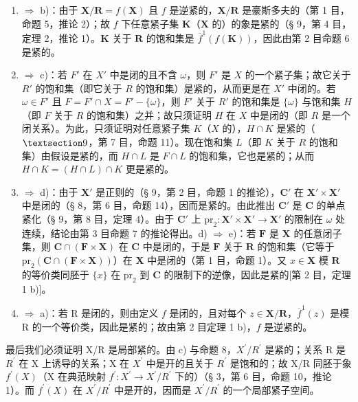 \begin{enumerate}
\def\labelenumi{\alph{enumi})}
\item
  \(\Longrightarrow\) b)：由于 \(\mathbf{X} / \mathbf{R} = f(\mathbf{X})\) 且 \(f\) 是逆紧的，\(\mathbf{X} / \mathbf{R}\) 是豪斯多夫的（第 1 目，命题 5，推论 2）；故 \(f\) 下任意紧子集 \(\mathbf{K}\)（\(\mathbf{X}\) 的）的象是紧的（§ 9，第 4 目，定理 2，推论 1）。\(\mathbf{K}\) 关于 \(\mathbf{R}\) 的饱和集是 \(\overline{f}^1(f(\mathbf{K}))\)，因此由第 2 目命题 6 是紧的。
\item
  \(\Longrightarrow\) c)：若 \(F'\) 在 \(X'\) 中是闭的且不含 \(\omega\)，则 \(F'\) 是 \(X\) 的一个紧子集；故它关于 \(R'\) 的饱和集（即它关于 \(R\) 的饱和集）是紧的，从而更是在 \(X'\) 中闭的。若 \(\omega \in F'\) 且 \(F = F' \cap X = F' - \{\omega\}\)，则 \(F'\) 关于 \(R'\) 的饱和集是 \(\{\omega\}\) 与饱和集 \(H\)（即 \(F\) 关于 \(R\) 的饱和集）之并；故只须证明 \(H\) 在 \(X\) 中是闭的（即 \(R\) 是一个闭关系）。为此，只须证明对任意紧子集 \(K\)（\(X\) 的），\(H \cap K\) 是紧的（\(\S 9\)，第 7 目，命题 11）。现在饱和集 \(L\)（即 \(K\) 关于 \(R\) 的饱和集）由假设是紧的，而 \(H \cap L\) 是 \(F \cap L\) 的饱和集，它也是紧的；从而 \(H \cap K = (H \cap L) \cap K\) 更是紧的。
\item
  \(\Longrightarrow\) d)：由于 \(\mathbf{X}'\) 是正则的（§ 9，第 2 目，命题 1 的推论），\(\mathbf{C}'\) 在 \(\mathbf{X}' \times \mathbf{X}'\) 中是闭的（§ 8，第 6 目，命题 14），因而是紧的。由此推出 \(\mathbf{C}'\) 是 \(\mathbf{C}\) 的单点紧化（§ 9，第 8 目，定理 4）。由于 \(\mathbf{C}'\) 上 \(\mathrm{pr}_2: \mathbf{X}' \times \mathbf{X}' \to \mathbf{X}'\) 的限制在 \(\omega\) 处连续，结论由第 3 目命题 7 的推论得出。d) \(\Longrightarrow\) e)：若 \(\mathbf{F}\) 是 \(\mathbf{X}\) 的任意闭子集，则 \(\mathbf{C} \cap (\mathbf{F} \times \mathbf{X})\) 在 \(\mathbf{C}\) 中是闭的，于是 \(\mathbf{F}\) 关于 \(\mathbf{R}\) 的饱和集（它等于 \(\mathrm{pr}_2(\mathbf{C} \cap (\mathbf{F} \times \mathbf{X}))\)）在 \(\mathbf{X}\) 中是闭的（第 1 目，命题 1）。又 \(x \in \mathbf{X}\) 模 \(\mathbf{R}\) 的等价类同胚于 \(\{x\}\) 在 \(\mathrm{pr}_2\) 到 \(\mathbf{C}\) 的限制下的逆像，因此是紧的{[}第 2 目，定理 1 b){]}。
\item
  \(\Rightarrow\) a)：若 R 是闭的，则由定义 \(f\) 是闭的，且对每个 \(z \in \mathbf{X} / \mathbf{R}\)，\(\overline{f}^1(z)\) 是模 R 的一个等价类，因此是紧的；故由第 2 目定理 1 b)，\(f\) 是逆紧的。
\end{enumerate}

最后我们必须证明 X/R 是局部紧的。由 c) 与命题 8，\(X^{\prime}/R^{\prime}\) 是紧的；关系 R 是 \(R^{\prime}\) 在 X 上诱导的关系；X 在 \(X^{\prime}\) 中是开的且关于 \(R^{\prime}\) 是饱和的；故 X/R 同胚于象 \(f^{\prime}(X)\)（X 在典范映射 \(f^{\prime}: X^{\prime} \to X^{\prime}/R^{\prime}\) 下的）（§ 3，第 6 目，命题 10，推论 1）。而 \(f^{\prime}(X)\) 在 \(X^{\prime}/R^{\prime}\) 中是开的，因而是 \(X^{\prime}/R^{\prime}\) 的一个局部紧子空间。

